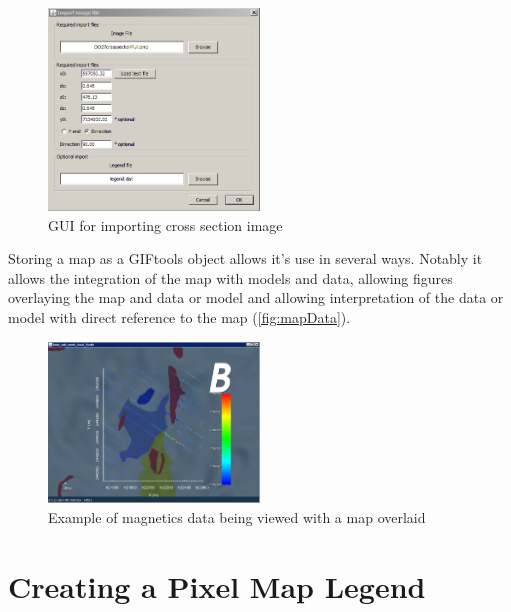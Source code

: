 \begin{figure} [h]
    \centering
    \includegraphics[width=0.5\textwidth]{images/MaptoModel/importCross.PNG}
    \caption{GUI for importing cross section image }
    \label{fig:importCrossGui}
\end{figure}
Storing a map as a GIFtools object allows it's use in several ways. Notably it allows the integration of the map with models and data, allowing figures overlaying the map and data or model and allowing interpretation of the data or model with direct reference to the map (\autoref{fig:mapData}).
\begin{figure} [h]
    \centering
    \includegraphics[width=0.5\textwidth]{images/MaptoModel/mapData.PNG}
    \caption{Example of magnetics data being viewed with a map overlaid }
    \label{fig:mapData}
\end{figure}



\section{Creating a Pixel Map Legend}
\label{sec:Create Pixel Map Legend}


